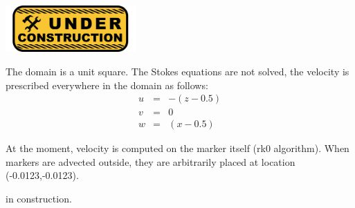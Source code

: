 
\includegraphics[width=5cm]{images/under_construction}

The domain is a unit square. The Stokes equations are not solved, the velocity is prescribed everywhere 
in the domain as follows:
\begin{eqnarray}
u&=&-(z-0.5)\\
v&=&0\\
w&=&(x-0.5)
\end{eqnarray}

At the moment, velocity is computed on the marker itself (rk0 algorithm).
When markers are advected outside, they are arbitrarily placed at location (-0.0123,-0.0123).

in construction. 
